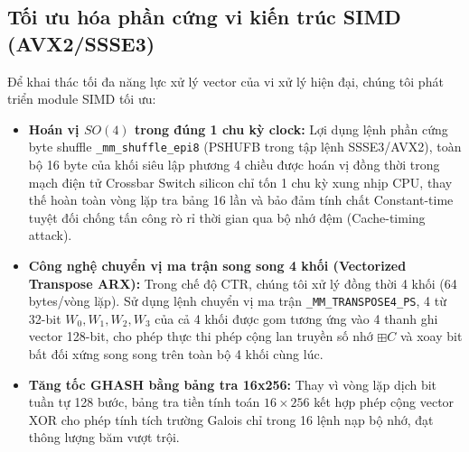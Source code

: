 \documentclass[10pt,twocolumn]{article}
\begin{document}
\subsection{Tối ưu hóa phần cứng vi kiến trúc SIMD (AVX2/SSSE3)}
Để khai thác tối đa năng lực xử lý vector của vi xử lý hiện đại, chúng tôi phát triển module SIMD tối ưu:
\begin{itemize}
    \item \textbf{Hoán vị $SO(4)$ trong đúng 1 chu kỳ clock:} Lợi dụng lệnh phần cứng byte shuffle \texttt{\_mm\_shuffle\_epi8} (PSHUFB trong tập lệnh SSSE3/AVX2), toàn bộ 16 byte của khối siêu lập phương 4 chiều được hoán vị đồng thời trong mạch điện tử Crossbar Switch silicon chỉ tốn 1 chu kỳ xung nhịp CPU, thay thế hoàn toàn vòng lặp tra bảng 16 lần và bảo đảm tính chất Constant-time tuyệt đối chống tấn công rò rỉ thời gian qua bộ nhớ đệm (Cache-timing attack).
    \item \textbf{Công nghệ chuyển vị ma trận song song 4 khối (Vectorized Transpose ARX):} Trong chế độ CTR, chúng tôi xử lý đồng thời 4 khối (64 bytes/vòng lặp). Sử dụng lệnh chuyển vị ma trận \texttt{\_MM\_TRANSPOSE4\_PS}, 4 từ 32-bit $W_0, W_1, W_2, W_3$ của cả 4 khối được gom tương ứng vào 4 thanh ghi vector 128-bit, cho phép thực thi phép cộng lan truyền số nhớ $\boxplus C$ và xoay bit bất đối xứng song song trên toàn bộ 4 khối cùng lúc.
    \item \textbf{Tăng tốc GHASH bằng bảng tra 16x256:} Thay vì vòng lặp dịch bit tuần tự 128 bước, bảng tra tiền tính toán $16 \times 256$ kết hợp phép cộng vector XOR cho phép tính tích trường Galois chỉ trong 16 lệnh nạp bộ nhớ, đạt thông lượng băm vượt trội.
\end{itemize}

\begin{table}[htbp]
\caption{Đo đạc vi kiến trúc hiệu năng SIMD và Rubik4D-GCM AEAD trên tệp 5~MB (50 lần lặp, Intel Core x86-64).}
\label{tab:simd_gcm_benchmark_vi}
\centering
\small
{}
\end{table}
\end{document}
